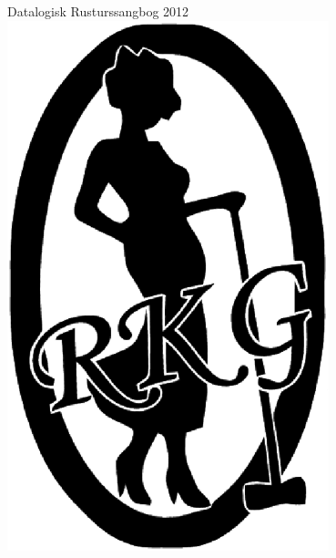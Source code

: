 \pagestyle{empty}
\begin{center}
  {\LARGE Datalogisk Rusturssangbog 2012}\\
  \includegraphics[width=0.7\textwidth]{logo.eps}
\end{center}

\newpage